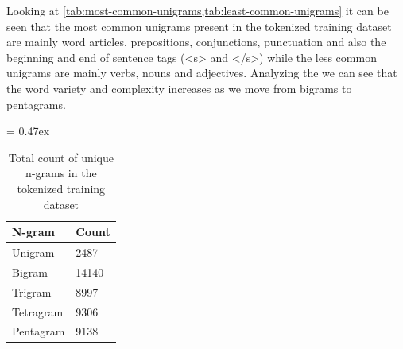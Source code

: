 Looking at \cref{tab:most-common-unigrams,tab:least-common-unigrams} it can be seen that the most common unigrams present in the tokenized training dataset are mainly word articles, prepositions, conjunctions, punctuation and also the beginning and end of sentence tags (<s> and </s>) while the less common unigrams are mainly verbs, nouns and adjectives. Analyzing the  we can see that the word variety and complexity increases as we move from bigrams to pentagrams.


\begin{table}[t]
	\caption{Total count of unique n-grams in the tokenized training dataset}
	\extrarowsep = 0.47ex
	\centering
	\begin{tabu} to 0.18\textwidth { X[l,m] X[r,m] }
		\rowfont{\bfseries\itshape} N-gram & Count \\
		\hline
		Unigram		&	 2487	\\
		Bigram		&	14140	\\
		Trigram		&	 8997	\\
		Tetragram	&	 9306	\\
		Pentagram	& 	 9138	\\
	\end{tabu}
	\label{tab:n-grams-counts}
\end{table}




